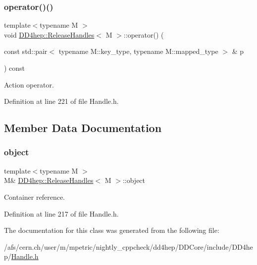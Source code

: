 \subsubsection{\texorpdfstring{operator()()}{operator()()}}
{\footnotesize\ttfamily template$<$typename M $>$ \\
void \hyperlink{class_d_d4hep_1_1_release_handles}{D\+D4hep\+::\+Release\+Handles}$<$ M $>$\+::operator() (\begin{DoxyParamCaption}\item[{const std\+::pair$<$ typename M\+::key\+\_\+type, typename M\+::mapped\+\_\+type $>$ \&}]{p }\end{DoxyParamCaption}) const\hspace{0.3cm}{\ttfamily [inline]}}



Action operator. 



Definition at line 221 of file Handle.\+h.



\subsection{Member Data Documentation}
\hypertarget{class_d_d4hep_1_1_release_handles_a859c2b05fd3a51dbbeee2b6937a19068}{}\label{class_d_d4hep_1_1_release_handles_a859c2b05fd3a51dbbeee2b6937a19068} 
\subsubsection{\texorpdfstring{object}{object}}
{\footnotesize\ttfamily template$<$typename M $>$ \\
M\& \hyperlink{class_d_d4hep_1_1_release_handles}{D\+D4hep\+::\+Release\+Handles}$<$ M $>$\+::object}



Container reference. 



Definition at line 217 of file Handle.\+h.



The documentation for this class was generated from the following file\+:\begin{DoxyCompactItemize}
\item 
/afs/cern.\+ch/user/m/mpetric/nightly\+\_\+cppcheck/dd4hep/\+D\+D\+Core/include/\+D\+D4hep/\hyperlink{_handle_8h}{Handle.\+h}\end{DoxyCompactItemize}
